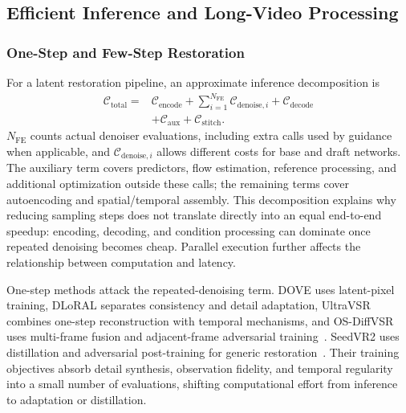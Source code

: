 \subsection{Efficient Inference and Long-Video Processing}
\label{sec:efficiency}
\subsubsection{One-Step and Few-Step Restoration}
For a latent restoration pipeline, an approximate inference decomposition is
\begin{equation}
\begin{split}
\mathcal C_{\mathrm{total}}={}&\mathcal C_{\mathrm{encode}}
+\sum_{i=1}^{N_{\mathrm{FE}}}\mathcal C_{\mathrm{denoise},i}
+\mathcal C_{\mathrm{decode}}\\
&+\mathcal C_{\mathrm{aux}}+\mathcal C_{\mathrm{stitch}}.
\end{split}
\label{eq:cost}
\end{equation}
$N_{\mathrm{FE}}$ counts actual denoiser evaluations, including extra calls used by guidance when applicable, and $\mathcal C_{\mathrm{denoise},i}$ allows different costs for base and draft networks. The auxiliary term covers predictors, flow estimation, reference processing, and additional optimization outside these calls; the remaining terms cover autoencoding and spatial/temporal assembly. This decomposition explains why reducing sampling steps does not translate directly into an equal end-to-end speedup: encoding, decoding, and condition processing can dominate once repeated denoising becomes cheap. Parallel execution further affects the relationship between computation and latency.

One-step methods attack the repeated-denoising term. DOVE uses latent-pixel training, DLoRAL separates consistency and detail adaptation, UltraVSR combines one-step reconstruction with temporal mechanisms, and OS-DiffVSR uses multi-frame fusion and adjacent-frame adversarial training~\cite{dove,dloral,ultra,osdiff}. SeedVR2 uses distillation and adversarial post-training for generic restoration~\cite{seedvr2}. Their training objectives absorb detail synthesis, observation fidelity, and temporal regularity into a small number of evaluations, shifting computational effort from inference to adaptation or distillation.

